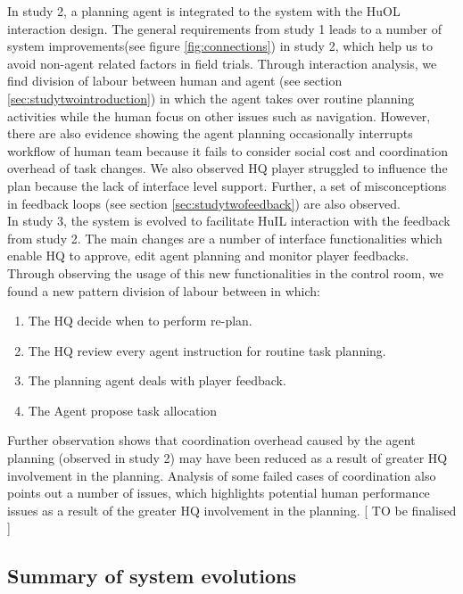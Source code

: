 In study 2, a planning agent is integrated to the system with the HuOL interaction design. The general requirements from study 1 leads to a number of system improvements(see figure \ref{fig:connections}) in study 2, which help us to avoid non-agent related factors in field trials. Through interaction analysis, we find division of labour between human and agent (see section \ref{sec:studytwointroduction}) in which the agent takes over routine planning activities while the human focus on other issues such as navigation. However, there are also evidence showing the agent planning occasionally interrupts workflow of human team because it fails to consider social cost and coordination overhead of task changes. We also observed HQ player struggled to influence the plan because the lack of interface level support. Further, a set of misconceptions in feedback loops (see section \ref{sec:studytwofeedback}) are also observed.\\

In study 3, the system is evolved to facilitate HuIL interaction with the feedback from study 2. The main changes are a number of interface functionalities which enable HQ to approve, edit agent planning and monitor player feedbacks. Through observing the usage of this new functionalities in the control room, we found a new pattern division of labour between in which:
	\begin{enumerate}
	 \item The HQ decide when to perform re-plan.
	 \item The HQ review every agent instruction for routine task planning.
	 \item The planning agent deals with player feedback.
	 \item The Agent propose task allocation
	\end{enumerate}
	
Further observation shows that coordination overhead caused by the agent planning (observed in study 2) may have been reduced as a result of greater HQ involvement in the planning. Analysis of some failed cases of coordination also points out a number of issues, which highlights potential human performance issues as a result of the greater HQ involvement in the planning. [ TO be finalised ]  \\

\subsection{Summary of system evolutions}









